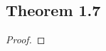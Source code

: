 \documentclass[../../main.tex]{subfiles}
\begin{document}
\subsection{Theorem 1.7}
\begin{wts}

\end{wts}
\begin{proof}

\end{proof}
\end{document}
